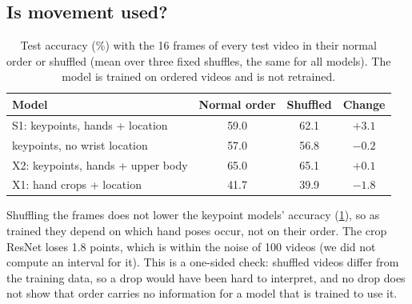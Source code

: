 \documentclass{article}
\begin{document}
\subsection{Is movement used?}
\begin{table}[t]
\centering\small\setlength{\tabcolsep}{3pt}
\begin{tabular}{lccc}
\toprule
Model & Normal order & Shuffled & Change \\
\midrule
S1: keypoints, hands + location     & 59.0 & 62.1 & $+3.1$ \\
keypoints, no wrist location        & 57.0 & 56.8 & $-0.2$ \\
X2: keypoints, hands + upper body   & 65.0 & 65.1 & $+0.1$ \\
X1: hand crops + location            & 41.7 & 39.9 & $-1.8$ \\
\bottomrule
\end{tabular}
\caption{Test accuracy (\%) with the 16 frames of every test video in their normal order or shuffled (mean over three fixed
shuffles, the same for all models). The model is trained on ordered videos and is not retrained.}
\label{tab:shuffle}
\end{table}

Shuffling the frames does not lower the keypoint models' accuracy (\cref{tab:shuffle}), so as trained they depend on
which hand poses occur, not on their order. The crop ResNet loses 1.8 points, which is within the noise of 100 videos (we
did not compute an interval for it). This is a one-sided check: shuffled videos differ from the training data, so a
drop would have been hard to interpret, and no drop does not show that order carries no information for a model that
is trained to use it.
\end{document}
